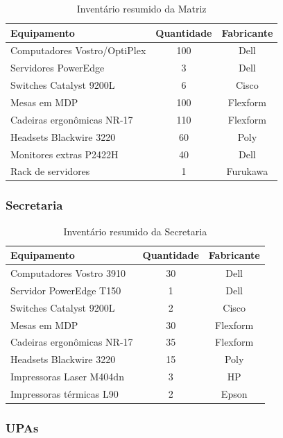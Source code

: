 \documentclass[12pt,a4paper,oneside]{report}
\begin{document}
\begin{table}[H]
\centering
\caption{Inventário resumido da Matriz}
\label{tab:inventario_matriz}
\begin{tabular}{lcc}
\toprule
\textbf{Equipamento} & \textbf{Quantidade} & \textbf{Fabricante} \\
\midrule
Computadores Vostro/OptiPlex & 100 & Dell \\
Servidores PowerEdge & 3 & Dell \\
Switches Catalyst 9200L & 6 & Cisco \\
Mesas em MDP & 100 & Flexform \\
Cadeiras ergonômicas NR-17 & 110 & Flexform \\
Headsets Blackwire 3220 & 60 & Poly \\
Monitores extras P2422H & 40 & Dell \\
Rack de servidores & 1 & Furukawa \\
\bottomrule
\end{tabular}
\end{table}

\subsubsection{Secretaria}

\begin{table}[H]
\centering
\caption{Inventário resumido da Secretaria}
\label{tab:inventario_secretaria}
\begin{tabular}{lcc}
\toprule
\textbf{Equipamento} & \textbf{Quantidade} & \textbf{Fabricante} \\
\midrule
Computadores Vostro 3910 & 30 & Dell \\
Servidor PowerEdge T150 & 1 & Dell \\
Switches Catalyst 9200L & 2 & Cisco \\
Mesas em MDP & 30 & Flexform \\
Cadeiras ergonômicas NR-17 & 35 & Flexform \\
Headsets Blackwire 3220 & 15 & Poly \\
Impressoras Laser M404dn & 3 & HP \\
Impressoras térmicas L90 & 2 & Epson \\
\bottomrule
\end{tabular}
\end{table}

\subsubsection{UPAs}
\end{document}
